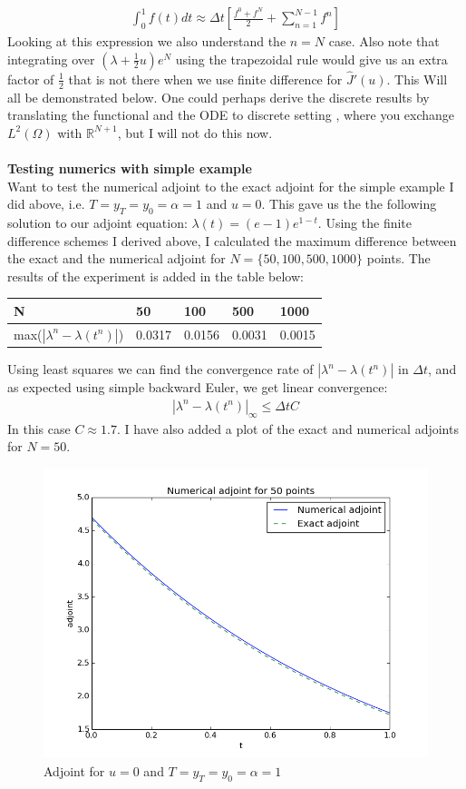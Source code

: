 \documentclass[11pt,a4paper]{report}
\begin{document}
\begin{align*}
\int_0^1 f(t)dt \approx \Delta t[\frac{f^0+f^N}{2}+\sum_{n=1}^{N-1}f^n]
\end{align*} 
Looking at this expression we also understand the $n=N$ case. Also note that integrating over $(\lambda + \frac{1}{2}u)e^N$ using the trapezoidal rule would give us an extra factor of $\frac{1}{2}$ that is not there when we use finite difference for $\hat{J}'(u)$. This Will all be demonstrated below. One could perhaps derive the discrete results by translating the functional and the ODE to discrete setting , where you exchange $L^2(\Omega)$ with $\mathbb{R}^{N+1}$, but I will not do this now. 
\\
\\
\textbf{Testing numerics with simple example}
\\
Want to test the numerical adjoint to the exact adjoint for the simple example I did above, i.e. $T=y_T=y_0=\alpha=1$ and $u=0$. This gave us the the following solution to our adjoint equation: $\lambda(t)=(e-1)e^{1-t}$. Using the finite difference schemes I derived above, I calculated the maximum difference between the exact and the numerical adjoint for $N=\{50,100,500,1000 \}$ points. The results of the experiment is added in the table below: 
\begin{center}
    \begin{tabular}{| l | l | l | l | l |}
    \hline
    N & 50 & 100  & 500 & 1000 \\ \hline
    max($|\lambda^n-\lambda(t^n)|$) & 0.0317 &0.0156&0.0031 &0.0015 	\\ \hline
    \end{tabular}
\end{center}
Using least squares we can find the convergence rate of $|\lambda^n-\lambda(t^n)|$ in $\Delta t$, and as expected using simple backward Euler, we get linear convergence: 
\begin{align*}
|\lambda^n-\lambda(t^n)|_{\infty} \leq \Delta t C
\end{align*}
In this case $C\approx1.7$. I have also added a plot of the exact and numerical adjoints for $N=50$.
\begin{figure}
  \includegraphics[width=\linewidth]{adjoint_plot.png}
  \caption{Adjoint for $u=0$ and $T=y_T=y_0=\alpha=1$}
  \label{Fig 1}
\end{figure}
\end{document}
